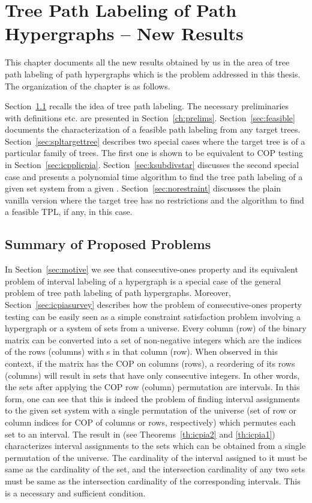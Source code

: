 \xclearpage

\chapter[Tree Path Labeling]{Tree Path Labeling of Path
  Hypergraphs -- New Results}
\label{ch:myresearch}

This chapter documents all the new results obtained by us in the area
of tree path labeling of path hypergraphs which is the problem
addressed in this thesis. The organization of the chapter is as
follows.

Section~\ref{sec:myresearchintro} recalls the idea of tree path
labeling. The necessary preliminaries with definitions etc. are
presented in Section~\ref{ch:prelims}. Section~\ref{sec:feasible}
documents the characterization of a feasible path labeling from any
target trees. Section~\ref{sec:spltargettree} describes two special
cases where the target tree is of a particular family of trees. The
first one is shown to be equivalent to COP testing in
Section~\ref{sec:icpplicpia}. Section~\ref{sec:ksubdivstar} discusses
the second special case and presents a polynomial time algorithm to
find the tree path labeling of a given set system from a given
\kstar. Section~\ref{sec:norestraint} discusses the plain vanilla
version where the target tree has no restrictions and the algorithm to
find a feasible TPL, if any, in this case.


\section[Summary of problems]{Summary of Proposed Problems}
\label{sec:myresearchintro}
In Section~\ref{sec:motive} we see that consecutive-ones property and
its equivalent problem of interval labeling of a hypergraph is a
special case of the general problem of tree path labeling of path
hypergraphs. Moreover, Section~\ref{sec:icpiasurvey} describes how the
problem of consecutive-ones property testing can be easily seen as a
simple constraint satisfaction problem involving a hypergraph or a
system of sets from a universe. Every column (row) of the binary
matrix can be converted into a set of non-negative integers which are
the indices of the rows (columns) with {\un}s in that column
(row). When observed in this context, if the matrix has the COP on
columns (rows), a reordering of its rows (columns) will result in sets
that have only consecutive integers. In other words, the sets after
applying the COP row (column) permutation are intervals.  In this
form, one can see that this is indeed the problem of finding interval
assignments to the given set system with a single permutation of the
universe (set of row or column indices for COP of columns or rows,
respectively) which permutes each set to an interval. The result in
\cite{nsnrs09} (see Theorems~\ref{th:icpia2} and \ref{th:icpia1})
characterizes interval assignments to the sets which can be obtained
from a single permutation of the universe. The cardinality of the
interval assigned to it must be same as the cardinality of the set,
and the intersection cardinality of any two sets must be same as the
intersection cardinality of the corresponding intervals. This is a
necessary and sufficient condition. 

